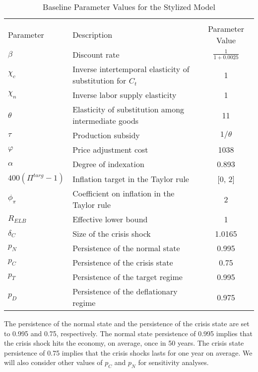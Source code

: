 \documentclass[11pt]{article}
\begin{document}
	\begin{table}[!htp]
		{\small
			\begin{center}
				\caption{Baseline Parameter Values for the Stylized Model\label{tab:ParameterValues_Basic}}
				\vspace{-1.5em}
				\begin{tabular}{llc}
					\multicolumn{3}{c}{}\\
					Parameter & Description  & Parameter Value  \\
					\hline
					\hline
					$\beta$      & Discount rate & $\frac{1}{1+0.0025}$ \\
					$\chi_{c}$   & Inverse intertemporal elasticity of substitution for $C_{t}$ & 1\\
					$\chi_{n}$   & Inverse labor supply elasticity & 1  \\
					$\theta$     & Elasticity of substitution among intermediate goods & 11 \\
					$\tau$       & Production subsidy & $1/\theta$\\
					$\varphi$    & Price adjustment cost & 1038\\
					$\alpha$     & Degree of indexation & 0.893\\
					\hline
					$400(\Pi^{targ}-1)$ & Inflation target in the Taylor rule & [0, 2]\\
					$\phi_{\pi}$ & Coefficient on inflation in the Taylor rule & 2\\
					$R_{ELB}$    & Effective lower bound & 1\\
					\hline
					$\delta_{C}$ & Size of the crisis shock & 1.0165\\
					$p_{N}$ & Persistence of the normal state  & 0.995\\
					$p_{C}$ & Persistence of the crisis state     & 0.75\\
					\hline
					$p_{T}$ & Persistence of the target regime     & 0.995\\
					$p_{D}$ & Persistence of the deflationary regime & 0.975\\
					\hline
					\hline
				\end{tabular}
			\end{center}
		}
		\vspace{-0.5em}
	\end{table}

	The persistence of the normal state and the persistence of the crisis state are set to 0.995 and 0.75, respectively. The normal state persistence of 0.995 implies that the crisis shock hits the economy, on average, once in 50 years. The crisis state persistence of 0.75 implies that the crisis shocks lasts for one year on average. We will also consider other values of $p_{C}$ and $p_{N}$ for sensitivity analyses.
\end{document}
